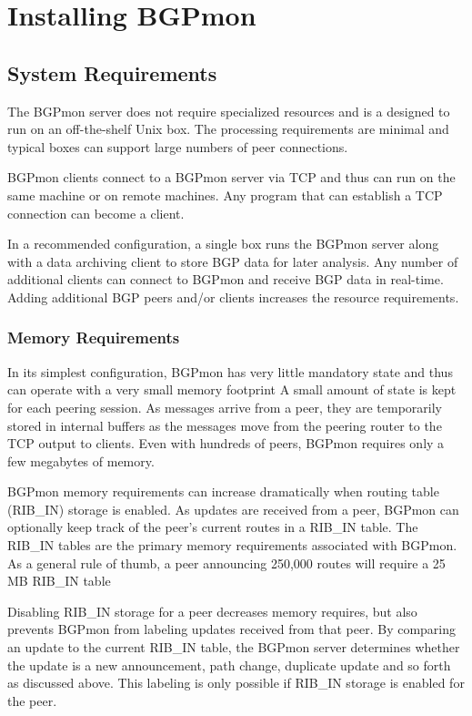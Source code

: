 \section{Installing BGPmon}
\label{sec:install}

\subsection{System  Requirements}

The BGPmon server does not require specialized resources and is a designed to run on an off-the-shelf Unix box. 
The processing requirements are minimal and typical boxes can support large numbers of peer connections.    

BGPmon clients connect to a BGPmon server via TCP and thus can run on the same machine or on remote machines.
Any program that can establish a TCP connection can become a client.


In a recommended configuration, a single box runs the BGPmon server along with a data archiving client to store BGP data for later analysis.
Any number of additional clients can connect to BGPmon and receive BGP data in real-time.
Adding additional BGP peers and/or clients increases the resource requirements.

\subsubsection{Memory Requirements}

In its simplest configuration, BGPmon has very little mandatory state and thus can operate with a very small memory footprint
A small amount of state is kept for each peering session.
As messages arrive from a peer, they are temporarily stored in internal buffers as the messages move from the peering router to the TCP output to clients.
Even with hundreds of peers, BGPmon requires only a few megabytes of memory.

BGPmon memory requirements can increase dramatically when routing table (RIB\_IN) storage is enabled.
As updates are received from a peer, BGPmon can optionally keep track of the peer's current routes in a RIB\_IN table.
The RIB\_IN tables are the primary memory requirements associated with BGPmon.
As a general rule of thumb, a peer announcing 250,000 routes will require a 25 MB RIB\_IN table 

Disabling RIB\_IN storage for a peer decreases memory requires, but also prevents BGPmon from labeling updates received from that peer.
By comparing an update to the current RIB\_IN table, the BGPmon server determines whether the update is a new announcement, path change, duplicate update and so forth as discussed above.
This labeling is only possible if RIB\_IN storage is enabled for the peer.

